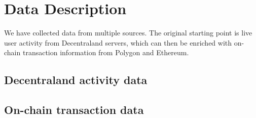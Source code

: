 \section{Data Description}
We have collected data from multiple sources. The original starting point is live user activity from Decentraland servers, which can then be enriched with on-chain transaction information from Polygon and Ethereum.

\subsection{Decentraland activity data}

\subsection{On-chain transaction data}